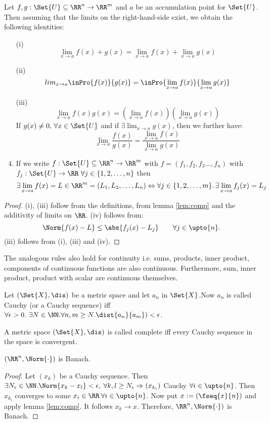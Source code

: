 \begin{thm}
 Let $f,g:\Set{U}\subseteq\RR^n\to\RR^m$ and $a$ be an accumulation point for $\Set{U}$. Then assuming that the limits on the right-hand-side exist, we obtain the following identities:
 \begin{enumerate}
  \item[(i)] $$\lim_{x\to a}f(x)+g(x)=\lim_{x\to a}f(x)+\lim_{x\to a}g(x)$$
  \item[(ii)] $$lim_{x\to a}\inPro{f(x)}{g(x)}=\inPro{\lim_{x\to a}f(x)}{\lim_{x\to a}g(x)}$$
  \item[(iii)] $$\lim_{x\to a}f(x)g(x)=\left(\lim_{x\to a}f(x)\right)\left(\lim_{x\to a}g(x)\right)$$
  If $g(x)\neq 0,\,\forall x\in\Set{U}$ and if $\exists \lim_{x\to a}g(x)$, then we further have:
  $$\lim_{x\to a}\frac{f(x)}{g(x)}=\frac{\lim_{x\to a}f(x)}{\lim_{x\to a}g(x)}$$
  \item If we write $f:\Set{U}\subseteq\RR^n\to\RR^m$ with $f=(f_1,f_2,f_3\ldots,f_n)$ with $f_j:\Set{U}\to\RR\ \forall j\in\{1,2,\ldots,n\}$ then $$\exists\lim_{x\to a}f(x)=L\in \RR^m=(L_1,L_2,\ldots,L_n)\Leftrightarrow \forall j\in\{1,2,\ldots,m\}.\,\exists\lim_{x\to a}f_j(x)=L_j$$
 \end{enumerate}
\end{thm}
\begin{proof}
 (i), (iii) follow from the definitions, from lemma \ref{lem:comp} and the additivity of limits on $\RR$.
 (iv) follows from: $$\Norm{f(x)-L}\leq \abs{f_j(x)-L_j}\qquad\forall j\in\upto{n}.$$
 (iii) follows from (i), (iii) and (iv).
\end{proof}
\begin{rem}
 The analogous rules also hold for continuity i.e. sums, products, inner product, components of continuous functions are also continuous. Furthermore, sum, inner product, product with scalar are continuous themselves.
\end{rem}
\begin{defn}
	Let $(\Set{X},\dis)$ be a metric space and let $a_n$ in $\Set{X}$.Now $a_n$ is called Cauchy (or a Cauchy sequence) iff $\forall \epsilon>0.\ \exists N\in\NN.\forall n,m\geq N.\dist{a_n}{a_m})<\epsilon$.
\end{defn}
\begin{defn}
	A metric space $(\Set{X},\dis)$ is called complete iff every Cauchy sequence in the space is convergent.
\end{defn}
\begin{thm}
 $(\RR^n,\Norm{\cdot})$ is Banach.
\end{thm}
\begin{proof}
 Let $(x_k)$ be a Cauchy sequence. Then $\exists N_\epsilon\in\NN.\Norm{x_k-x_l}<\epsilon, \:\forall k,l \geq N_\epsilon\Rightarrow (x_{k_i})$ Cauchy $\forall i\in\upto{n}$. Then $x_{k_i}$ converges to some $x_i\in\RR\:\forall i\in\upto{n}$. Now put $x:=(\fseq{x}{n})$ and apply lemma \ref{lem:comp}. It follows $x_k\to x$. Therefore, $\RR^n, \Norm{\cdot})$ is Banach.
\end{proof}
